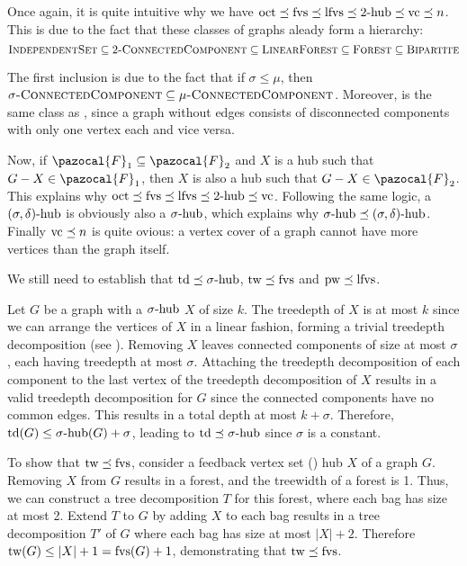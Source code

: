 

\medskip

Once again, it is quite intuitive why we have $\oct \lp \fvs \lp \lfvs \lp \shub[2] \lp \vc \lp n$. This is due to the fact that these classes of graphs aleady form a hierarchy:
$$\prob{IndependentSet} \subseteq \prob{$2$-ConnectedComponent} \subseteq \prob{LinearForest} \subseteq \prob{Forest} \subseteq \prob{Bipartite}$$

The first inclusion is due to the fact that if $\sigma \leq \mu$, then $\sigma\prob{-ConnectedComponent} \subseteq \mu\prob{-ConnectedComponent}$. Moreover,  is the same class as , since a graph without edges consists of disconnected components with only one vertex each and vice versa.

Now, if $\pazocal{F}_1 \subseteq \pazocal{F}_2$ and $X$ is a hub such that $G - X \in \pazocal{F}_1$, then $X$ is also a hub such that $G - X \in \pazocal{F}_2$. This explains why $\oct \lp \fvs \lp \lfvs \lp \shub[2] \lp \vc$. Following the same logic, a $\sdhub$ is obviously also a $\shub$, which explains why $\shub \lp \sdhub$. Finally $\vc \lp n$ is quite ovious: a vertex cover of a graph cannot have more vertices than the graph itself.

\medskip

We still need to establish that $\td \lp \shub$, $\tw \lp \fvs$ and $\pw \lp \lfvs$.

\medskip

Let $G$ be a graph with a $\shub$ $X$ of size $k$. The treedepth of $X$ is at most $k$ since we can arrange the vertices of $X$ in a linear fashion, forming a trivial treedepth decomposition (see ). Removing $X$ leaves connected components of size at most $\sigma$, each having treedepth at most $\sigma$. Attaching the treedepth decomposition of each component to the last vertex of the treedepth decomposition of $X$ results in a valid treedepth decomposition for $G$ since the connected components have no common edges. This results in a total depth at most $k + \sigma$. Therefore, $\td(G) \leq \shub(G) + \sigma$, leading to $\td \lp \shub$ since $\sigma$ is a constant.



\medskip

To show that $\tw \lp \fvs$, consider a feedback vertex set (\fvs) hub $X$ of a graph $G$. Removing $X$ from $G$ results in a forest, and the treewidth of a forest is 1. Thus, we can construct a tree decomposition $T$ for this forest, where each bag has size at most 2. Extend $T$ to $G$ by adding $X$ to each bag results in a tree decomposition $T'$ of $G$ where each bag has size at most $|X| + 2$. Therefore $\tw(G) \leq |X| + 1 = \fvs(G) + 1$, demonstrating that $\tw \lp \fvs$.

